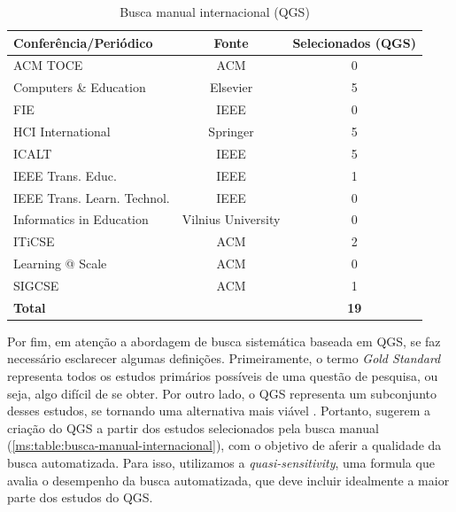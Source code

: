 \begin{table}[htbp]
\centering
\caption{Busca manual internacional (QGS)}
\label{ms:table:busca-manual-internacional}
\begin{tabular}{lcc}
\hline
\textbf{Conferência/Periódico} & \textbf{Fonte}     & \textbf{Selecionados (QGS)} \\ \hline
ACM TOCE                       & ACM                & 0            \\ 
Computers \& Education         & Elsevier           & 5            \\ 
FIE                            & IEEE               & 0            \\ 
HCI International              & Springer           & 5            \\ 
ICALT                          & IEEE               & 5            \\ 
IEEE Trans. Educ.              & IEEE               & 1            \\ 
IEEE Trans. Learn. Technol.    & IEEE               & 0            \\ 
Informatics in Education       & Vilnius University & 0            \\ 
ITiCSE                         & ACM                & 2            \\ 
Learning @ Scale               & ACM                & 0            \\ 
SIGCSE                         & ACM                & 1            \\ 
\textbf{Total}                 & \textbf{}          & \textbf{19}  \\ \hline
\end{tabular}
\fautor
\end{table}

Por fim, em atenção a abordagem de busca sistemática baseada em QGS, se faz necessário esclarecer algumas definições. Primeiramente, o termo \textit{Gold Standard} representa todos os estudos primários possíveis de uma questão de pesquisa, ou seja, algo difícil de se obter. Por outro lado, o QGS representa um subconjunto desses estudos, se tornando uma alternativa mais viável \cite{Zhang2011}. Portanto,  sugerem a criação do QGS a partir dos estudos selecionados pela busca manual (\autoref{ms:table:busca-manual-internacional}), com o objetivo de aferir a qualidade da busca automatizada. Para isso, utilizamos a \textit{quasi-sensitivity}, uma formula que avalia o desempenho da busca automatizada, que deve incluir idealmente a maior parte dos estudos do QGS. 

